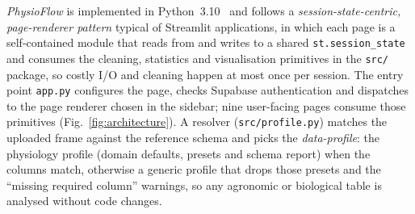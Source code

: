 \documentclass[preprint,12pt,a4paper]{elsarticle}
\begin{document}
\emph{PhysioFlow} is implemented in Python~3.10~\cite{Streamlit,McKinney2010,Harris2020} and follows a \emph{session-state-centric, page-renderer pattern} typical of Streamlit applications, in which each page is a self-contained module that reads from and writes to a shared \texttt{st.session\_state} and consumes the cleaning, statistics and visualisation primitives in the \texttt{src/} package, so costly I/O and cleaning happen at most once per session. The entry point \texttt{app.py} configures the page, checks Supabase authentication and dispatches to the page renderer chosen in the sidebar; nine user-facing pages consume those primitives (Fig.~\ref{fig:architecture}). A resolver (\texttt{src/profile.py}) matches the uploaded frame against the reference schema and picks the \emph{data-profile}: the physiology profile (domain defaults, presets and schema report) when the columns match, otherwise a generic profile that drops those presets and the ``missing required column'' warnings, so any agronomic or biological table is analysed without code changes.
\end{document}
